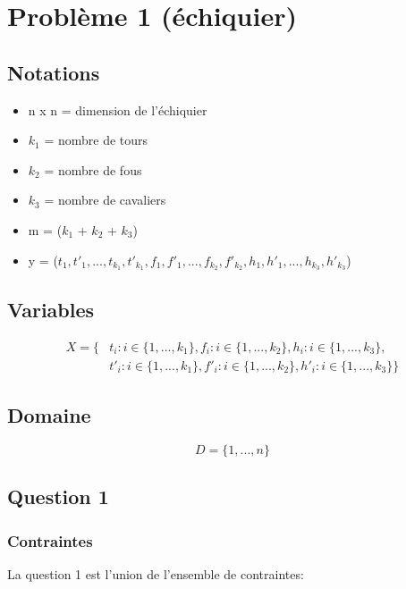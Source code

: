 \documentclass[a4paper,11pt]{article}
\begin{document}
\section{Problème 1 (échiquier)}
\subsection{Notations}
\begin{itemize}
\item n x n = dimension de l'échiquier
\item $k_{1}$ = nombre de tours
\item $k_{2}$ = nombre de fous
\item $k_{3}$ = nombre de cavaliers

\item m = ($k_{1}$ + $k_{2}$ + $k_{3}$)
\item y = ($t_{1}, t'_{1}, ..., t_{k_{1}}, t'_{k_{1}}, f_{1}, f'_{1}, ..., f_{k_{2}}, f'_{k_{2}}, h_{1}, h'_{1}, ..., h_{k_{3}}, h'_{k_{3}}$)
\end{itemize}

\subsection{Variables}
\begin{equation}
  \begin{split}
    X = \{ &t_{i} : i \in  \{1, ..., k_{1} \}, f_{i} : i \in  \{1, ..., k_{2} \}, h_{i} : i \in  \{1, ..., k_{3} \}, \\
    &t'_{i} : i \in  \{1, ..., k_{1} \}, f'_{i} : i \in  \{1, ..., k_{2} \}, h'_{i} : i \in  \{1, ..., k_{3} \} \}
  \end{split}
\end{equation}

\subsection{Domaine}
$$D = \{1, ..., n \}$$

\subsection{Question 1}
\subsubsection{Contraintes}
La question 1 est l'union de l’ensemble de contraintes:
\end{document}

